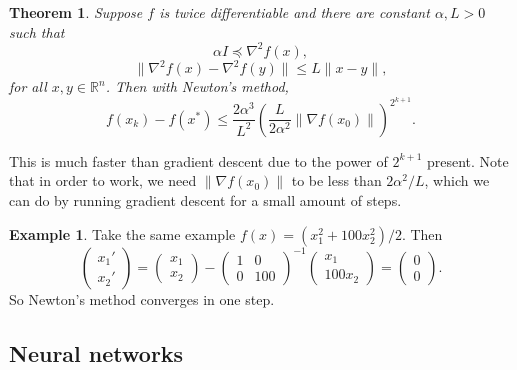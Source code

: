 \documentclass[12pt]{article}
\newtheorem{theorem}{Theorem}[section]
\theoremstyle{definition}
\newtheorem{example}{Example}[section]
\theoremstyle{remark}
\begin{document}
\begin{theorem}
	Suppose $f$ is twice differentiable and there are constant $\alpha, L > 0$ such that
	\[
		\alpha I \preceq \nabla^2 f(x),
	\]
	\[
		\|\nabla^2 f(x) - \nabla^2 f(y) \| \leq L\|x - y\|
	,\]
	for all $x, y \in \mathbb{R}^{n}$. Then with Newton's method,
	\[
		f(x_k) - f(x^{\ast}) \leq \frac{2 \alpha^3}{L^2} \left( \frac{L}{2 \alpha^2} \| \nabla f(x_0) \| \right)^{2^{k+1}}
	.\]
\end{theorem}

This is much faster than gradient descent due to the power of $2^{k+1}$ present. Note that in order to work, we need $\|\nabla f(x_0) \|$ to be less than $2\alpha^2/L$, which we can do by running gradient descent for a small amount of steps.

\begin{adjustbox}{minipage = \columnwidth - 25.5pt, margin=1em, frame=1pt, margin=0em}
\begin{example}
	Take the same example $f(x) = (x_1^2 + 100x_2^2)/2$. Then
	\[
	\begin{pmatrix}
		x_1' \\
		x_2'
	\end{pmatrix}
	=
	\begin{pmatrix}
		x_1 \\
		x_2
	\end{pmatrix}
	-
	\begin{pmatrix}
		1 & 0 \\
		0 & 100
	\end{pmatrix}
	^{-1}
	\begin{pmatrix}
		x_1 \\
		100x_2
	\end{pmatrix}
	=
	\begin{pmatrix}
		0 \\
		0
	\end{pmatrix}
	.\]
	So Newton's method converges in one step.
\end{example}

\end{adjustbox}

\subsection{Neural networks}%
\label{sub:neural_networks}
\end{document}
